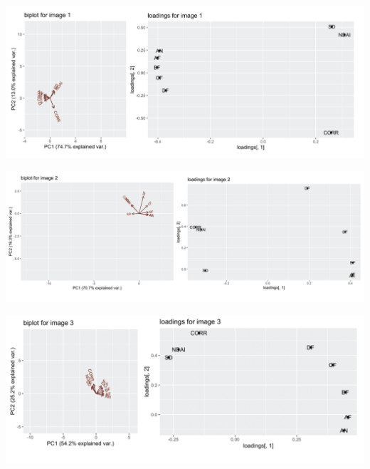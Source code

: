 \documentclass[11pt]{article}
\begin{document}
\includegraphics[width = 13.5cm]{2(c)pca1.png}

\includegraphics[width = 13.5cm]{2(c)pca2.png}

\includegraphics[width = 13.5cm]{2(c)pca3.png}
\end{document}
